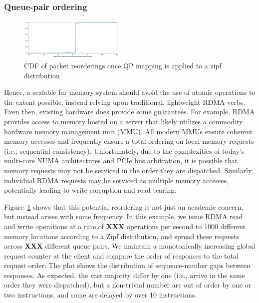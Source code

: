 \subsubsection{Queue-pair ordering}

\begin{figure}[t]
    \includegraphics[width=0.45\textwidth]{fig/qp_reordering.pdf}
    \caption{CDF of packet reorderings once QP mapping is applied to a zipf distribution}
    \label{fig:reorder}
\end{figure}

Hence, a scalable far memory system should avoid the use of atomic
operations to the extent possible, instead relying upon traditional,
lightweight RDMA verbs.  Even then, existing hardware does provide
some guarantees.  For example, RDMA provides access to memory hosted
on a server that likely utilizes a commodity hardware memory
management unit (MMU).  All modern MMUs ensure coherent memory
accesses and frequently ensure a total ordering on local memory
requests (i.e., sequential consistency).  Unfortunately, due to the
complexities of today's multi-core NUMA architectures and PCIe bus
arbitration, it is possible that memory requests may not be serviced
in the order they are dispatched.  Similarly, individual RDMA requests
may be serviced as multiple memory accesses, potentially leading to
write corruption and read tearing.

Figure~\ref{fig:reorder} shows that this potential reordering is not
just an academic concern, but instead arises with some frequency.  In
this example, we issue RDMA read and write operations at a rate of
\textbf{XXX} operations per second to 1000 different memory
locations according to a Zipf distribution, and spread these requests
across \textbf{XXX} different queue pairs.  We maintain a monotonically
increasing global request counter at the client and compare the order
of responses to the total request order.  The plot shows the
distribution of sequence-number gaps between responses.  As expected,
the vast majority differ by one (i.e., arrive in the same order they
were dispatched), but a non-trivial number are out of order by one or
two instructions, and some are delayed by over 10 instructions.


